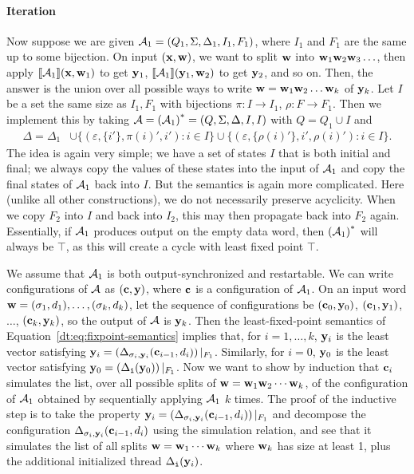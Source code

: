 \paragraph*{Iteration}
Now suppose we are given $\mathcal{A}_1 = (Q_{1}, \Sigma, \Delta_{1}, I_{1}, F_{1})$, where $I_1$ and $F_1$ are the same up to some bijection. On input $(\mathbf{x},\mathbf{w})$, we want to split $\mathbf{w}$ into $\mathbf{w}_1 \mathbf{w}_2 \mathbf{w}_3 \ldots$, then apply $\llbracket \mathcal{A}_1 \rrbracket(\mathbf{x},\mathbf{w}_1)$ to get $\mathbf{y}_1$, $\llbracket \mathcal{A}_1 \rrbracket(\mathbf{y}_1,\mathbf{w}_2)$ to get $\mathbf{y}_2$, and so on. Then, the answer is the union over all possible ways to write $\mathbf{w} = \mathbf{w}_1 \mathbf{w}_2 \ldots \mathbf{w}_k$ of $\mathbf{y}_k$. Let $I$ be a set the same size as $I_1, F_1$ with bijections $\pi: I \to I_1$, $\rho: F \to F_1$. Then we implement this by taking $\mathcal{A} = {{(\mathcal{A}_1)}^{*}} = (Q, \Sigma, \Delta, I, I)$ with $Q = Q_1 \cup I$ and
\begin{align*}
\Delta = \Delta_1
    &\cup \big\{(\varepsilon, \{i'\}, \pi(i)', i'): i \in I \big\}
    \cup \big\{(\varepsilon, \{\rho(i)'\}, i', \rho(i)'): i \in I \big\}.
\end{align*}
The idea is again very simple; we have a set of states $I$ that is both initial and final; we always copy the values of these states into the input of $\mathcal{A}_1$ and copy the final states of $\mathcal{A}_1$ back into $I$. But the semantics is again more complicated. Here (unlike all other constructions), we do not necessarily preserve acyclicity. When we copy $F_2$ into $I$ and back into $I_2$, this may then propagate back into $F_2$ again. Essentially, if $\mathcal{A}_1$ produces output on the empty data word, then ${{(\mathcal{A}_1)}^{*}}$ will always be $\top$, as this will create a cycle with least fixed point $\top$.

We assume that $\mathcal{A}_1$ is both output-synchronized and restartable. We can write configurations of $\mathcal{A}$ as $(\mathbf{c}, \mathbf{y})$, where $\mathbf{c}$ is a configuration of $\mathcal{A}_1$.
On an input word $\mathbf{w} = (\sigma_1,d_1),\ldots,(\sigma_k,d_k)$, let the sequence of configurations be $(\mathbf{c}_0, \mathbf{y}_0)$, $(\mathbf{c}_1,\mathbf{y}_1)$, $\ldots$, $(\mathbf{c}_k, \mathbf{y}_k)$, so the output of $\mathcal{A}$ is $\mathbf{y}_k$.
Then the least-fixed-point semantics of Equation~\eqref{dt:eq:fixpoint-semantics} implies that, for $i=1, \ldots, k$, $\mathbf{y}_i$ is the least vector satisfying $\mathbf{y}_i = \left(\Delta_{\sigma_i, \mathbf{y}_i}(\mathbf{c}_{i-1}, d_i)\right)|_{F_1}$. Similarly, for $i = 0$, $\mathbf{y}_0$ is the least vector satisfying $\mathbf{y}_0 = \left(\Delta_{\texttt{i}}(\mathbf{y}_0)\right)|_{F_1}$. Now we want to show by induction that $\mathbf{c}_i$ simulates the list, over all possible splits of $\mathbf{w} = \mathbf{w}_1 \mathbf{w}_2 \cdots \mathbf{w}_k$, of the configuration of $\mathcal{A}_1$ obtained by sequentially applying $\mathcal{A}_1$ $k$ times. The proof of the inductive step is to take the property $\mathbf{y}_i = \left(\Delta_{\sigma_i, \mathbf{y}_i}(\mathbf{c}_{i-1}, d_i)\right)|_{F_1}$ and decompose the configuration $\Delta_{\sigma_i, \mathbf{y}_i}(\mathbf{c}_{i-1}, d_i)$ using the simulation relation, and see that it simulates the list of all splits $\mathbf{w} = \mathbf{w}_1 \cdots \mathbf{w}_k$ where $\mathbf{w}_k$ has size at least 1, plus the additional initialized thread $\Delta_{\texttt{i}}(\mathbf{y}_i)$.

